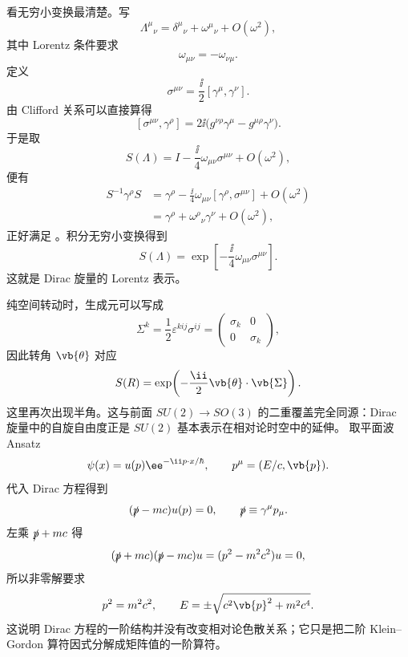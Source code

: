看无穷小变换最清楚。写
\[
\Lambda^\mu{}_{\nu}
=\delta^\mu{}_{\nu}+\omega^\mu{}_{\nu}+O(\omega^2),
\]
其中 Lorentz 条件要求
\[
\omega_{\mu\nu}=-\omega_{\nu\mu}.
\]
定义
\[
\sigma^{\mu\nu}=\frac{\ii}{2}[\gamma^\mu,\gamma^\nu].
\]
由 Clifford 关系可以直接算得
\begin{equation*}{
[\sigma^{\mu\nu},\gamma^\rho]
=2\ii\bigl(g^{\nu\rho}\gamma^\mu-g^{\mu\rho}\gamma^\nu\bigr)
}.\end{equation*}
于是取
\[
S(\Lambda)
=I-\frac{\ii}{4}\omega_{\mu\nu}\sigma^{\mu\nu}+O(\omega^2),
\]
便有
\[
\begin{aligned}
S^{-1}\gamma^\rho S
&=\gamma^\rho
-\frac{\ii}{4}\omega_{\mu\nu}[\gamma^\rho,\sigma^{\mu\nu}]+O(\omega^2)\\
&=\gamma^\rho+\omega^\rho{}_{\nu}\gamma^\nu+O(\omega^2),
\end{aligned}
\]
正好满足 。积分无穷小变换得到
\[
{
S(\Lambda)
=\exp\!\left[-\frac{\ii}{4}\omega_{\mu\nu}\sigma^{\mu\nu}\right]
}.
\]
这就是 Dirac 旋量的 Lorentz 表示。

纯空间转动时，生成元可以写成
\[
\Sigma^k=\frac12\varepsilon^{kij}\sigma^{ij}
=\begin{pmatrix}
\sigma_k&0\\0&\sigma_k
\end{pmatrix},
\]
因此转角 $\vb{\theta}$ 对应
\[
S(R)=\exp\!\left(-\frac{\ii}{2}\vb{\theta}\cdot\vb{\Sigma}\right).
\]
这里再次出现半角。这与前面 $SU(2)\to SO(3)$ 的二重覆盖完全同源：Dirac 旋量中的自旋自由度正是 $SU(2)$ 基本表示在相对论时空中的延伸。
取平面波 Ansatz
\[
\psi(x)=u(p)\ee^{-\ii p\cdot x/\hbar},
\qquad p^\mu=(E/c,\vb{p}).
\]
代入 Dirac 方程得到
\begin{equation}
(\slashed p-mc)u(p)=0,
\qquad
\slashed p\equiv\gamma^\mu p_\mu.
\label{eq:dirac-u-equation}
\end{equation}
左乘 $\slashed p+mc$ 得
\[
(\slashed p+mc)(\slashed p-mc)u
=(p^2-m^2c^2)u=0,
\]
所以非零解要求
\[
p^2=m^2c^2,
\qquad
E=\pm\sqrt{c^2\vb{p}^2+m^2c^4}.
\]
这说明 Dirac 方程的一阶结构并没有改变相对论色散关系；它只是把二阶 Klein--Gordon 算符因式分解成矩阵值的一阶算符。

